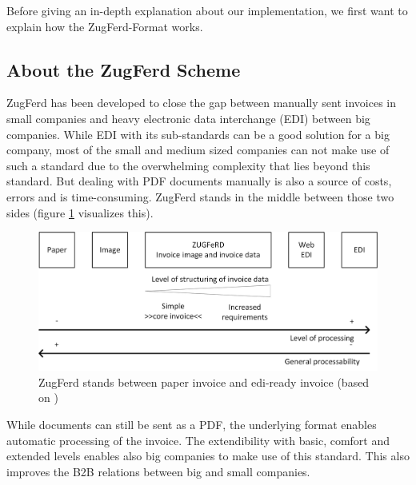 Before giving an in-depth explanation about our implementation, we first want to explain how the ZugFerd-Format works.

\subsection{About the ZugFerd Scheme}
\label{sec5.7.1}

ZugFerd has been developed to close the gap between manually sent invoices in small companies and heavy electronic data interchange (EDI) between big companies. While EDI with its sub-standards can be a good solution for a big company, most of the small and medium sized companies can not make use of such a standard due to the overwhelming complexity that lies beyond this standard. But dealing with PDF documents manually is also a source of costs, errors and is time-consuming. ZugFerd stands in the middle between those two sides (figure \ref{zugFerdImage} visualizes this).
\begin{figure}[htb!]
\centering
\includegraphics[width=\textwidth]{Images/ZugFerd/ZugFerd_English.jpg}
\caption{ZugFerd stands between paper invoice and edi-ready invoice (based on \cite[page 13]{zugFerdSpecificationEnglish})  \label{zugFerdImage}}
\end{figure}

While documents can still be sent as a PDF, the underlying format enables automatic processing of the invoice. The extendibility with basic, comfort and extended levels enables also big companies to make use of this standard. This also improves the B2B relations between big and small companies.

